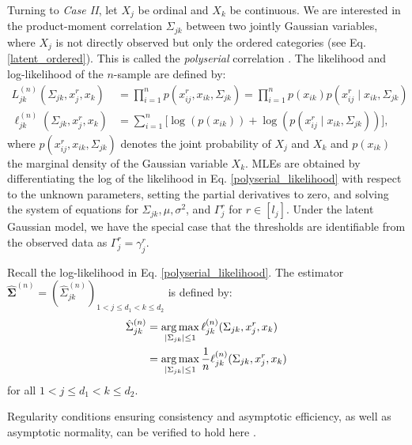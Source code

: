 Turning to \textit{Case II}, let $X_j$ be ordinal and $X_k$ be continuous. We are interested in the product-moment correlation $\Sigma_{jk}$ between two jointly Gaussian variables, where $X_j$ is not directly observed but only the ordered categories (see Eq. \eqref{latent_ordered}). This is called the \textit{polyserial} correlation \cite{Olsson82}. The likelihood and log-likelihood of the $n$-sample are defined by:
\begin{equation}\label{polyserial_likelihood}
    \begin{split}
        L_{jk}^{(n)}(\Sigma_{jk}, x_j^r,x_k) &= \prod_{i=1}^n p(x^r_{ij},x_{ik}, \Sigma_{jk}) = \prod_{i=1}^n p(x_{ik})p(x^r_{ij} \mid x_{ik}, \Sigma_{jk}) \\
        \ell_{jk}^{(n)}(\Sigma_{jk}, x^r_j,x_k) &= \sum_{i=1}^n \big[\log(p(x_{ik})) + \log(p(x^r_{ij} \mid x_{ik}, \Sigma_{jk}))\big],
    \end{split}
\end{equation}
where $p(x_{ij}^{r},x_{ik}, \Sigma_{jk})$ denotes the joint probability of  $X_j$ and $X_k$ and $p(x_{ik})$ the marginal density of the Gaussian variable $X_k$. MLEs are obtained by differentiating the log of the likelihood in Eq. \eqref{polyserial_likelihood} with respect to the unknown parameters, setting the partial derivatives to zero, and solving the system of equations for $\Sigma_{jk}, \mu, \sigma^2$, and $\Gamma_j^r$ for $r \in [l_j]$. Under the latent Gaussian model, we have the special case that the thresholds are identifiable from the observed data as \(\Gamma_j^r = \gamma_j^r\).

\begin{definition}\label{definition_case2}
    Recall the log-likelihood in Eq. \eqref{polyserial_likelihood}. The estimator $\hat{\mathbf{\Sigma}}^{(n)} = (\hat{\Sigma}_{jk}^{(n)})_{1 < j \leq d_1 < k \leq d_2}$ is defined by:
    \begin{equation}
        \begin{split}
            \hat{\Sigma}_{jk}^{(n)} &= \argmax_{\Abs{\Sigma_{jk}} \leq 1} \ell_{jk}^{(n)}(\Sigma_{jk}, x^r_j,x_k) \\
            &= \argmax_{\Abs{\Sigma_{jk}} \leq 1} \frac{1}{n} \ell_{jk}^{(n)}(\Sigma_{jk}, x^r_j,x_k)
        \end{split}
    \end{equation}
    for all $1 < j \leq d_1 < k \leq d_2$.
\end{definition}
\noindent Regularity conditions ensuring consistency and asymptotic efficiency, as well as asymptotic normality, can be verified to hold here \cite{Cox74}.

